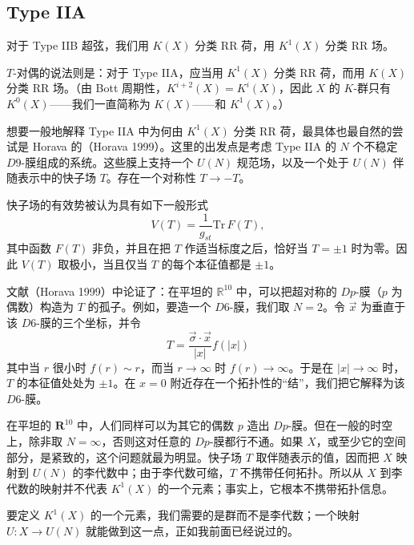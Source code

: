 \subsection{Type IIA}

对于 Type IIB 超弦，我们用 \(K(X)\) 分类 RR 荷，用 \(K^1(X)\) 分类 RR 场。

\(T\)-对偶的说法则是：对于 Type IIA，应当用 \(K^1(X)\) 分类 RR 荷，而用 \(K(X)\) 分类 RR 场。（由 Bott 周期性，\(K^{i+2}(X)=K^i(X)\)，因此 \(X\) 的 \(K\)-群只有 \(K^0(X)\)——我们一直简称为 \(K(X)\)——和 \(K^1(X)\)。）

想要一般地解释 Type IIA 中为何由 \(K^1(X)\) 分类 RR 荷，最具体也最自然的尝试是 Horava 的（Horava 1999）。这里的出发点是考虑 Type IIA 的 \(N\) 个不稳定 \(D9\)-膜组成的系统。这些膜上支持一个 \(U(N)\) 规范场，以及一个处于 \(U(N)\) 伴随表示中的快子场 \(T\)。存在一个对称性 \(T\to -T\)。

快子场的有效势被认为具有如下一般形式 \begin{equation}\tag{3.1}\label{eq:3.1}
V(T)=\frac{1}{g_{st}}\mathrm{Tr}\,F(T),
\end{equation} 其中函数 \(F(T)\) 非负，并且在把 \(T\) 作适当标度之后，恰好当 \(T=\pm 1\) 时为零。因此 \(V(T)\) 取极小，当且仅当 \(T\) 的每个本征值都是 \(\pm 1\)。

文献（Horava 1999）中论证了：在平坦的 \(\mathbb{R}^{10}\) 中，可以把超对称的 \(Dp\)-膜（\(p\) 为偶数）构造为 \(T\) 的孤子。例如，要造一个 \(D6\)-膜，我们取 \(N=2\)。令 \(\vec x\) 为垂直于该 \(D6\)-膜的三个坐标，并令 \begin{equation}\tag{3.2}\label{eq:3.2}
T=\frac{\vec\sigma\cdot\vec x}{|x|}f(|x|)
\end{equation} 其中当 \(r\) 很小时 \(f(r)\sim r\)，而当 \(r\to\infty\) 时 \(f(r)\to\infty\)。于是在 \(|x|\to\infty\) 时，\(T\) 的本征值处处为 \(\pm 1\)。在 \(x=0\) 附近存在一个拓扑性的“结”，我们把它解释为该 \(D6\)-膜。

在平坦的 \({\mathbf R}^{10}\) 中，人们同样可以为其它的偶数 \(p\) 造出 \(Dp\)-膜。但在一般的时空上，除非取 \(N=\infty\)，否则这对任意的 \(Dp\)-膜都行不通。如果 \(X\)，或至少它的空间部分，是紧致的，这个问题就最为明显。快子场 \(T\) 取伴随表示的值，因而把 \(X\) 映射到 \(U(N)\) 的李代数中；由于李代数可缩，\(T\) 不携带任何拓扑。所以从 \(X\) 到李代数的映射并不代表 \(K^1(X)\) 的一个元素；事实上，它根本不携带拓扑信息。

要定义 \(K^1(X)\) 的一个元素，我们需要的是群而不是李代数；一个映射 \(U:X\to U(N)\) 就能做到这一点，正如我前面已经说过的。

